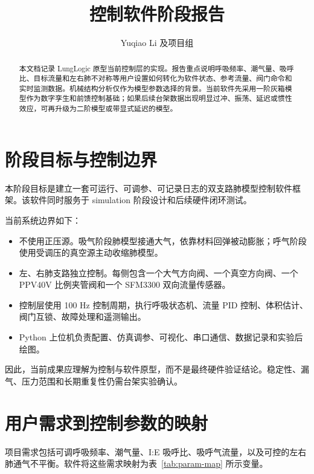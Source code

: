 \documentclass[UTF8,11pt,a4paper]{ctexart}
\title{\bfseries\color{titleblue}控制软件阶段报告}
\author{Yuqiao Li 及项目组}
\begin{document}
\maketitle

\begin{abstract}
本文档记录 LungLogic 原型当前控制层的实现。报告重点说明呼吸频率、潮气量、吸呼比、目标流量和左右肺不对称等用户设置如何转化为软件状态、参考流量、阀门命令和实时监测数据。机械结构分析仅作为模型参数选择的背景。当前软件先采用一阶灰箱模型作为数字孪生和前馈控制基础；如果后续台架数据出现明显过冲、振荡、延迟或惯性效应，可再升级为二阶模型或带显式延迟的模型。
\end{abstract}

\vspace{1em}
\tableofcontents
\newpage

\section{阶段目标与控制边界}

本阶段目标是建立一套可运行、可调参、可记录日志的双支路肺模型控制软件框架。该软件同时服务于 simulation 阶段设计和后续硬件闭环测试。

当前系统边界如下：
\begin{itemize}
  \item 不使用正压源。吸气阶段肺模型接通大气，依靠材料回弹被动膨胀；呼气阶段使用受调压的真空源主动收缩肺模型。
  \item 左、右肺支路独立控制。每侧包含一个大气方向阀、一个真空方向阀、一个 PPV40V 比例夹管阀和一个 SFM3300 双向流量传感器。
  \item 控制层使用 100 Hz 控制周期，执行呼吸状态机、流量 PID 控制、体积估计、阀门互锁、故障处理和遥测输出。
  \item Python 上位机负责配置、仿真调参、可视化、串口通信、数据记录和实验后绘图。
\end{itemize}

因此，当前成果应理解为控制与软件原型，而不是最终硬件验证结论。稳定性、漏气、压力范围和长期重复性仍需台架实验确认。

\section{用户需求到控制参数的映射}

项目需求包括可调呼吸频率、潮气量、I:E 吸呼比、吸呼气流量，以及可控的左右肺通气不平衡。软件将这些需求映射为表~\ref{tab:param-map} 所示变量。
\end{document}
